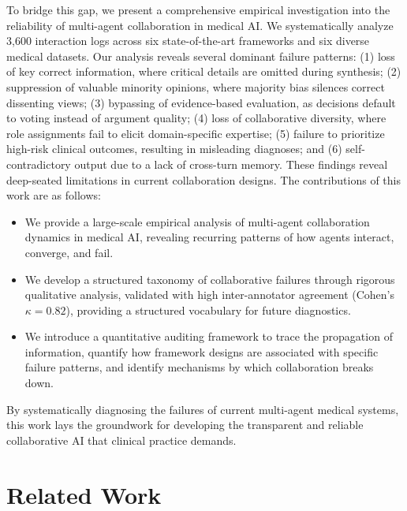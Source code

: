 \documentclass{article}
\begin{document}
To bridge this gap, we present a comprehensive empirical investigation into the reliability of multi-agent collaboration in medical AI. We systematically analyze 3,600 interaction logs across six state-of-the-art frameworks and six diverse medical datasets. Our analysis reveals several dominant failure patterns: (1) loss of key correct information, where critical details are omitted during synthesis; (2) suppression of valuable minority opinions, where majority bias silences correct dissenting views; (3) bypassing of evidence-based evaluation, as decisions default to voting instead of argument quality; (4) loss of collaborative diversity, where role assignments fail to elicit domain-specific expertise; (5) failure to prioritize high-risk clinical outcomes, resulting in misleading diagnoses; and (6) self-contradictory output due to a lack of cross-turn memory. These findings reveal deep-seated limitations in current collaboration designs. The contributions of this work are as follows:
\begin{itemize}
    \item We provide a large-scale empirical analysis of multi-agent collaboration dynamics in medical AI, revealing recurring patterns of how agents interact, converge, and fail.
    \item We develop a structured taxonomy of collaborative failures through rigorous qualitative analysis, validated with high inter-annotator agreement (Cohen's $\kappa=0.82$), providing a structured vocabulary for future diagnostics.
    \item We introduce a quantitative auditing framework to trace the propagation of information, quantify how framework designs are associated with specific failure patterns, and identify mechanisms by which collaboration breaks down.
\end{itemize}

By systematically diagnosing the failures of current multi-agent medical systems, this work lays the groundwork for developing the transparent and reliable collaborative AI that clinical practice demands.

\section{Related Work}
\end{document}
